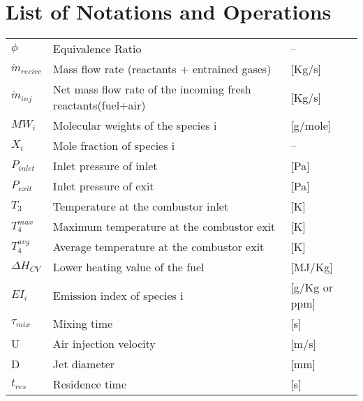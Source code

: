 \chapter*{List of Notations and Operations}\label{LstSym}

\begin{flushleft}
\begin{longtable}{l l l}
	
$\phi$ & Equivalence Ratio & --\\
$\dot{m}_{recirc}$ & Mass flow rate (reactants + entrained gases) & [Kg/s] \\
$\dot{m}_{inj}$ & Net mass flow rate of the incoming fresh reactants(fuel+air) & [Kg/s] \\
$MW_i$ &  Molecular weights of the species i & [g/mole] \\
$X_i$ & Mole fraction of species i & -- \\
$P_{inlet}$ & Inlet pressure of inlet & [Pa] \\
$P_{exit}$ & Inlet pressure of exit & [Pa] \\
$T_3$ & Temperature at the combustor inlet & [K] \\
$T_4^{max}$ & Maximum temperature at the combustor exit & [K] \\
$T_4^{avg}$ & Average temperature at the combustor exit & [K] \\
$\Delta H_{CV}$ &  Lower heating value of the fuel & [MJ/Kg] \\
$EI_{i}$ & Emission index of species i & [g/Kg or ppm]  \\
$\tau_{mix}$ & Mixing time & [s] \\
U & Air injection velocity & [m/s] \\
D & Jet diameter & [mm] \\
$t_{res}$ & Residence time & [s] \\

\end{longtable}
\end{flushleft}

